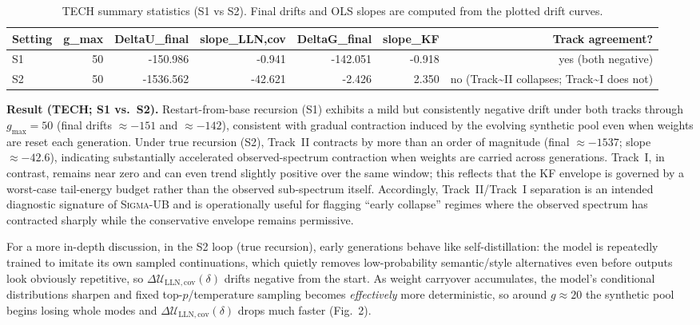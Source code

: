 \documentclass{article}
\theoremstyle{plain}
\theoremstyle{definition}
\theoremstyle{remark}
\newcommand{\sgma}{\textsc{Sigma}\xspace}
\begin{document}
\begin{table}[ht!]
\centering
\caption{TECH summary statistics (S1 vs S2). Final drifts and OLS slopes are computed from the plotted drift curves.}
\label{tab:tech_s1s2_summary}
\small
\begin{tabular}{lrrrrrr}
\toprule
Setting & g\_max & DeltaU\_final & slope\_LLN,cov & DeltaG\_final & slope\_KF & Track agreement? \\
\midrule
S1 & 50 & -150.986 & -0.941 & -142.051 & -0.918 & yes (both negative) \\
S2 & 50 & -1536.562 & -42.621 & -2.426 & 2.350 & no (Track\textasciitilde{}II collapses; Track\textasciitilde{}I does not) \\
\bottomrule
\end{tabular}
\end{table}


\noindent\textbf{Result (TECH; S1 vs.\ S2).}
Restart-from-base recursion (S1) exhibits a mild but consistently negative drift under both tracks through $g_{\max}=50$ (final drifts $\approx-151$ and $\approx-142$), consistent with gradual contraction induced by the evolving synthetic pool even when weights are reset each generation. Under true recursion (S2), Track~II contracts by more than an order of magnitude (final $\approx-1537$; slope $\approx-42.6$), indicating substantially accelerated observed-spectrum contraction when weights are carried across generations. Track~I, in contrast, remains near zero and can even trend slightly positive over the same window; this reflects that the KF envelope is governed by a worst-case tail-energy budget rather than the observed sub-spectrum itself. Accordingly, Track~II/Track~I separation is an intended diagnostic signature of \sgma-UB and is operationally useful for flagging “early collapse” regimes where the observed spectrum has contracted sharply while the conservative envelope remains permissive.

\noindent For a more in-depth discussion, in the S2 loop (true recursion), early generations behave like self-distillation: the model is repeatedly trained to imitate its own sampled continuations, which quietly removes low-probability semantic/style alternatives even before outputs look obviously repetitive, so $\Delta\mathcal{U}_{\mathrm{LLN,cov}}(\delta)$ drifts negative from the start. As weight carryover accumulates, the model’s conditional distributions sharpen and fixed top-$p$/temperature sampling becomes \emph{effectively} more deterministic, so around $g\!\approx\!20$ the synthetic pool begins losing whole modes and $\Delta\mathcal{U}_{\mathrm{LLN,cov}}(\delta)$ drops much faster (Fig.~2). 
\end{document}
